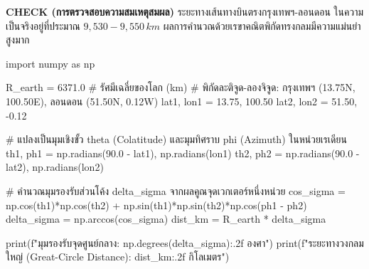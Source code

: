 \begin{mathexample}
\vspace{0.2cm}
\textbf{CHECK (การตรวจสอบความสมเหตุสมผล)}
ระยะทางเส้นทางบินตรงกรุงเทพฯ-ลอนดอน ในความเป็นจริงอยู่ที่ประมาณ $9,530 - 9,550\,\si{km}$ ผลการคำนวณด้วยเรขาคณิตพิกัดทรงกลมมีความแม่นยำสูงมาก\qedexam

\begin{pythonbox}
import numpy as np

R_earth = 6371.0  # รัศมีเฉลี่ยของโลก (km)
# พิกัดละติจูด-ลองจิจูด: กรุงเทพฯ (13.75N, 100.50E), ลอนดอน (51.50N, 0.12W)
lat1, lon1 = 13.75, 100.50
lat2, lon2 = 51.50, -0.12

# แปลงเป็นมุมเชิงขั้ว theta (Colatitude) และมุมทิศราบ phi (Azimuth) ในหน่วยเรเดียน
th1, ph1 = np.radians(90.0 - lat1), np.radians(lon1)
th2, ph2 = np.radians(90.0 - lat2), np.radians(lon2)

# คำนวณมุมรองรับส่วนโค้ง delta_sigma จากผลคูณจุดเวกเตอร์หนึ่งหน่วย
cos_sigma = np.cos(th1)*np.cos(th2) + np.sin(th1)*np.sin(th2)*np.cos(ph1 - ph2)
delta_sigma = np.arccos(cos_sigma)
dist_km = R_earth * delta_sigma

print(f"มุมรองรับจุดศูนย์กลาง: {np.degrees(delta_sigma):.2f} องศา")
print(f"ระยะทางวงกลมใหญ่ (Great-Circle Distance): {dist_km:.2f} กิโลเมตร")
\end{pythonbox}
\end{mathexample}

